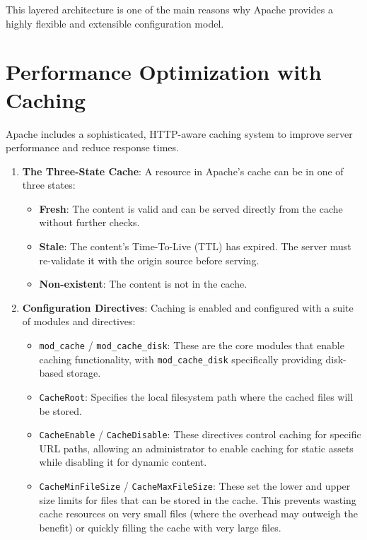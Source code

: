 \documentclass{scrbook}
\begin{document}
	This layered architecture is one of the main reasons why Apache provides a highly flexible and extensible configuration model.
	
	\section{Performance Optimization with Caching}
	
	Apache includes a sophisticated, HTTP-aware caching system to improve server performance and reduce response times.
	
	\begin{enumerate}
	    \item
	    \textbf{The Three-State Cache}: A resource in Apache's cache can be in one of three states:
	    \begin{itemize}
	        \item \textbf{Fresh}: The content is valid and can be served directly from the cache without further checks.
	        
	        \item \textbf{Stale}: The content's Time-To-Live (TTL) has expired. The server must re-validate it with the origin source before serving.
	        
	        \item \textbf{Non-existent}: The content is not in the cache.
	    \end{itemize}
	    
	    \item
	    \textbf{Configuration Directives}: Caching is enabled and configured with a suite of modules and directives:
	    \begin{itemize}
	        \item
	        \texttt{mod\_cache} / \texttt{mod\_cache\_disk}: These are the core modules that enable caching functionality, with \texttt{mod\_cache\_disk} specifically providing disk-based storage.
	            
	        \item
	        \texttt{CacheRoot}: Specifies the local filesystem path where the cached files will be stored.
	        
	        \item
	        \texttt{CacheEnable} / \texttt{CacheDisable}: These directives control caching for specific URL paths, allowing an administrator to enable caching for static assets while disabling it for dynamic content.
	        
	        \item
	        \texttt{CacheMinFileSize} / \texttt{CacheMaxFileSize}: These set the lower and upper size limits for files that can be stored in the cache. This prevents wasting cache resources on very small files (where the overhead may outweigh the benefit) or quickly filling the cache with very large files.
	        

\end{itemize}
\end{enumerate}
\end{document}
